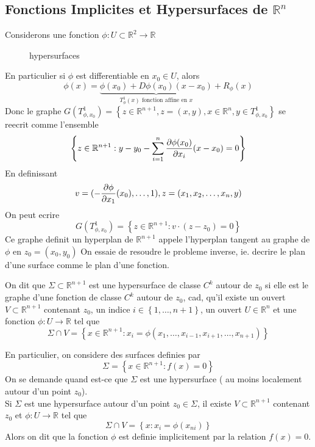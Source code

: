 \documentclass[../main.tex]{subfiles}
\begin{document}
\subsection{Fonctions Implicites et Hypersurfaces de $\mathbb{R}^{n}$}
Considerons une fonction $\phi: U\subset \mathbb{R}^{2}\to \mathbb{R}$
\begin{figure}[H]
    \centering
    \caption{hypersurfaces}
    \label{fig:hypersurfaces}
\end{figure}
En particulier si $\phi$ est differentiable en  $x_0\in U$, alors
\[ 
	\phi( x) = \underbrace{\phi( x_0) + D\phi( x_0 ) ( x-x_0) }_{T_\phi^{1}( x) \text{ fonction affine en  } x}+ R_{\phi} ( x) 
\]
Donc le graphe  $G( T_{\phi,x_0} ^{1}) = \left\{ z \in \mathbb{R}^{n+1}, z=( x,y) ,x \in \mathbb{R}^n, y \in T_{\phi,x_0} ^{1} \right\} $ se reecrit comme l'ensemble
\[ 
	\left\{ z\in \mathbb{R}^{n+1}: y-y_0 - \sum_{i=1}^{ n} \frac{\partial \phi( x_0) }{\partial x_i}( x-x_0) =0 \right\} 
\]
En definissant
\[ 
	v = ( - \frac{\partial \phi}{\partial x_1}( x_0) , \ldots,  1) , z= ( x_{1} , x_2 , \ldots, x_n, y) 
\]
On peut ecrire
\[ 
	G( T_{\phi,x_0} ^{1}) = \left\{ z \in \mathbb{R}^{n+1}: v\cdot ( z-z_0) = 0 \right\} 
\]
Ce graphe definit un hyperplan de $\mathbb{R}^{n+1}$ appele l'hyperplan tangent au graphe de $\phi$ en $z_0= ( x_0,y_0) $
On essaie de resoudre le probleme inverse, ie. decrire le plan d'une surface comme le plan d'une fonction.\\
\begin{defn}
On dit que $\Sigma\subset \mathbb{R}^{n+1}$ est une hypersurface de classe $C^{k}$ autour de $z_0$ si elle est le graphe d'une fonction  de classe $C^{k}$ autour de $z_0$, cad, qu'il existe un ouvert $V\subset \mathbb{R}^{n+1}$ contenant $z_0$, un indice $i \in \left\{ 1, \ldots, n+1 \right\} $, un ouvert $U \in \mathbb{R}^{n}$  et une fonction $\phi: U \to \mathbb{R}$ tel que
\[ 
	\Sigma \cap V = \left\{ x \in \mathbb{R}^{n+1}: x_i = \phi( x_1, \ldots, x_{i-1} , x_{i+1} , \ldots, x_{n+1} )  \right\} 
\]

\end{defn}
En particulier, on considere des surfaces definies par
\[ 
	\Sigma = \left\{ x \in \mathbb{R}^{n+1}: f( x) =0 \right\} 
\]
On se demande quand est-ce que $\Sigma$ est une hypersurface ( au moins localement autour d'un point $z_0$).\\
Si $\Sigma$ est une hypersurface autour d'un point $z_0\in \Sigma$, il existe $V \subset \mathbb{R}^{n+1}$ contenant $z_0$ et $\phi: U \to \mathbb{R} $ tel que
\[ 
	\Sigma \cap V = \left\{  x : x_i = \phi( x_{ni} )  \right\} 
\]
Alors on dit que la fonction $\phi$ est definie implicitement par la relation $f( x) =0$.
\end{document}
